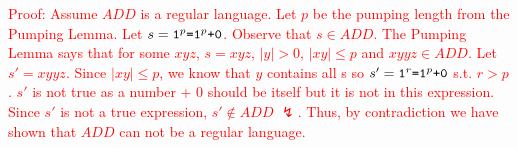 \textcolor{red}{
    Proof: Assume $ADD$ is a regular language. Let $p$ be the pumping length from the Pumping Lemma. Let $s = \texttt{1}^p\texttt{=1}^p\texttt{+0}$. Observe that $s \in ADD$. The Pumping Lemma says that for some $xyz$, $s=xyz$, $|y| > 0$, $|xy| \leq p$ and $xyyz \in ADD$. Let $s' = xyyz$. Since $|xy| \leq p$, we know that $y$ contains all s so $s' = \texttt{1}^r\texttt{=1}^p\texttt{+0}$ s.t. $r > p$. $s'$ is not true as  a number + 0 should be itself but it is not in this expression. Since $s'$ is not a true expression, $s' \notin ADD$ $\lightning$. Thus, by contradiction we have shown that $ADD$ can not be a regular language.
}